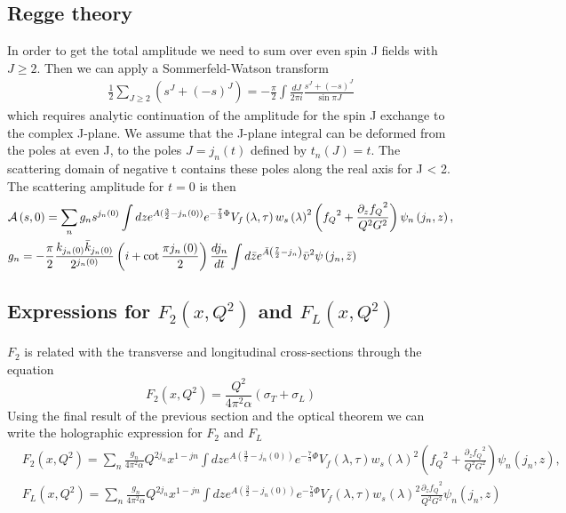 \documentclass[10 pt]{article}
\begin{document}
\subsection{Regge theory}
In order to get the total amplitude we need to sum over even spin J fields with $J \geq 2$. Then we can apply a Sommerfeld-Watson transform
\begin{align}
\frac{1}{2} \sum_{J \geq 2} \left(s^J + {\left(-s\right)}^J\right) = - \frac{\pi}{2} \int \frac{d J}{2 \pi i} \frac{s^J + \left(-s\right)^J}{\sin \pi J}
\end{align}
which requires analytic continuation of the amplitude for the spin J exchange to the complex J-plane. We assume that the J-plane integral can be deformed from the poles at even J, to the poles $J = j_n \left(t\right)$ defined by $t_n \left(J\right) = t$. The scattering domain of negative t contains these poles along the real axis for J < 2. The scattering amplitude for $t = 0$ is then
\begin{align}
&\mathcal{A} \left(s, 0 \right) = \sum_n g_n s^{j_n\left(0\right)} \int dz e^{A(\frac{3}{2} - {j_n\left(0\right)})} e^{-\frac{7}{3} \Phi}  V_f \left( \lambda, \tau \right) {w_s\left(\lambda \right)}^2  \left(  {f_Q}^2 + \frac{{\partial_z f_Q}^2}{Q^2 G^2}  \right) \psi_n \left(j_n, z\right), \\
& g_n = - \frac{\pi}{2} \frac{k_{j_n\left(0\right)} \bar{k}_{j_n\left(0\right)}}{2^{j_n\left(0\right)}}  \left(i + \cot \frac{\pi j_n\left(0\right)}{2} \right) \frac{d j_n}{dt} \int d\bar{z} e^{\bar{A}\left( \frac{7}{2} - j_n \right)}  {\bar{\upsilon}}^2  \psi\left(j_n, \bar{z}\right) \notag
\end{align}

\subsection{Expressions for $F_2\left(x, Q^2\right)$ and $F_L\left(x, Q^2\right)$}
$F_2$ is related with the transverse and longitudinal cross-sections through the equation
\begin{equation}
 F_2\left(x, Q^2\right) = \frac{Q^2}{4 \pi^2 \alpha} \left( \sigma_T + \sigma_L \right)
\end{equation}
Using the final result of the previous section and the optical theorem we can write the holographic expression for $F_2$ and $F_L$
\begin{align}
 &F_2\left(x, Q^2\right) = \sum_n \frac{g_n}{4 \pi^2 \alpha} Q^{2 j_n} x^{1-jn} \int dz e^{A(\frac{3}{2} - {j_n\left(0\right)})} e^{-\frac{7}{3} \Phi}  V_f \left( \lambda, \tau \right) {w_s\left(\lambda \right)}^2  \left(  {f_Q}^2 + \frac{{\partial_z f_Q}^2}{Q^2 G^2}  \right) \psi_n \left(j_n, z\right), \\
& F_L\left(x, Q^2\right) = \sum_n \frac{g_n}{4 \pi^2 \alpha} Q^{2 j_n} x^{1-jn} \int dz e^{A(\frac{3}{2} - {j_n\left(0\right)})} e^{-\frac{7}{3} \Phi}  V_f \left( \lambda, \tau \right) {w_s\left(\lambda \right)}^2  \frac{{\partial_z f_Q}^2}{Q^2 G^2} \psi_n \left(j_n, z\right)
\end{align}
\end{document}
